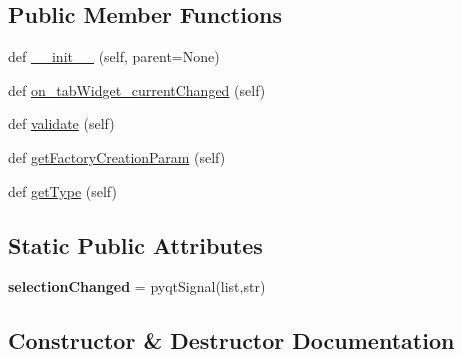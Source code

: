 \subsection*{Public Member Functions}
\begin{DoxyCompactItemize}
\item 
def \mbox{\hyperlink{class_dsg_tools_1_1_custom_widgets_1_1tab_db_selector_widget_1_1_tab_db_selector_widget_a197ca1ec46d9a796c476e04c7ae61cc7}{\+\_\+\+\_\+init\+\_\+\+\_\+}} (self, parent=None)
\item 
def \mbox{\hyperlink{class_dsg_tools_1_1_custom_widgets_1_1tab_db_selector_widget_1_1_tab_db_selector_widget_a4a32858c9fc02173567b68770ab07b97}{on\+\_\+tab\+Widget\+\_\+current\+Changed}} (self)
\item 
def \mbox{\hyperlink{class_dsg_tools_1_1_custom_widgets_1_1tab_db_selector_widget_1_1_tab_db_selector_widget_a2f6226412b0879e7c06418254f7415d9}{validate}} (self)
\item 
def \mbox{\hyperlink{class_dsg_tools_1_1_custom_widgets_1_1tab_db_selector_widget_1_1_tab_db_selector_widget_af22c865f916fec2c76d1eaad8010b1a6}{get\+Factory\+Creation\+Param}} (self)
\item 
def \mbox{\hyperlink{class_dsg_tools_1_1_custom_widgets_1_1tab_db_selector_widget_1_1_tab_db_selector_widget_a1e2a4f72fc3ba89fb592b3204ff88723}{get\+Type}} (self)
\end{DoxyCompactItemize}
\subsection*{Static Public Attributes}
\begin{DoxyCompactItemize}
\item 
\mbox{\label{class_dsg_tools_1_1_custom_widgets_1_1tab_db_selector_widget_1_1_tab_db_selector_widget_aa2ed147fd5fcbac7a2670d89714e2313}} 
{\bfseries selection\+Changed} = pyqt\+Signal(list,str)
\end{DoxyCompactItemize}


\subsection{Constructor \& Destructor Documentation}
\mbox{\label{class_dsg_tools_1_1_custom_widgets_1_1tab_db_selector_widget_1_1_tab_db_selector_widget_a197ca1ec46d9a796c476e04c7ae61cc7}} 
